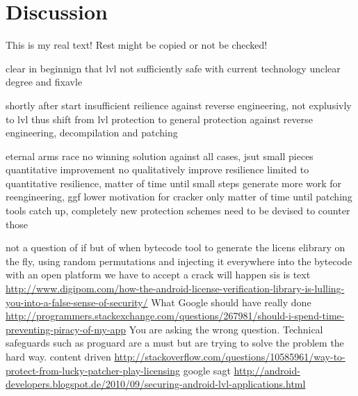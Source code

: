 \section{Discussion}\label{section:conclusion-discussion}
This is my real text! Rest might be copied or not be checked!

%
clear in beginnign that lvl not sufficiently safe with current technology
unclear degree and fixavle

shortly after start insufficient reilience against reverse engineering, not explusivly to lvl
thus shift from lvl protection to general protection against reverse engineering, decompilation and patching

eternal arms race
no winning solution against all cases, jsut small pieces quantitative improvement
no qualitatively improve resilience
limited to quantitative resilience, matter of time until small steps
generate more work for reengineering, ggf lower motivation for cracker
only matter of time until patching tools catch up, completely new protection schemes need to be devised to counter those
\cite{munteanLicense}
%

%
not a question of if but of when
bytecode tool to generate the licens elibrary on the fly, using random  permutations and injecting it everywhere into the bytecode
with an open platform we have to accept a crack will happen
\cite{digipomLvl}
%
sis is text
\url{http://www.digipom.com/how-the-android-license-verification-library-is-lulling-you-into-a-false-sense-of-security/} What Google should have really done
\newline
\url{http://programmers.stackexchange.com/questions/267981/should-i-spend-time-preventing-piracy-of-my-app} You are asking the wrong question. Technical safeguards such as proguard are a must but are trying to solve the problem the hard way.\newline
content driven \url{http://stackoverflow.com/questions/10585961/way-to-protect-from-lucky-patcher-play-licensing}\newline
google sagt \url{http://android-developers.blogspot.de/2010/09/securing-android-lvl-applications.html}\newline
